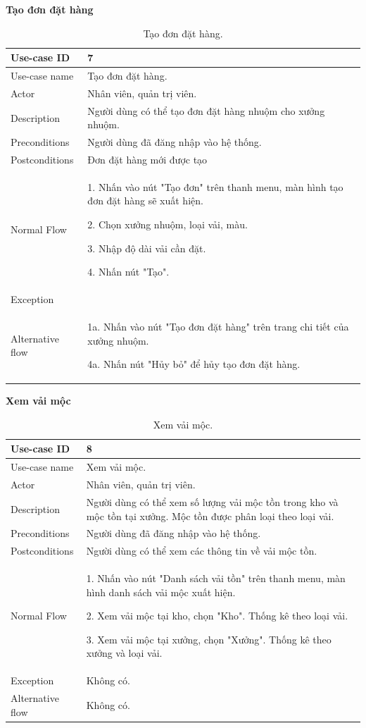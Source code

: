 \newpage
\textbf{Tạo đơn đặt hàng}
\begin{table}[!htp]
    \centering
    \begin{tabular}{|m{3cm}|m{10cm}|}
    \hline 
        Use-case ID & 7\\ \hline
        Use-case name & Tạo đơn đặt hàng.\\ \hline
        Actor & Nhân viên, quản trị viên.\\ \hline
        Description & Người dùng có thể tạo đơn đặt hàng nhuộm cho xưởng nhuộm.\\ \hline
        Preconditions & Người dùng đã đăng nhập vào hệ thống.\\ \hline
        Postconditions & Đơn đặt hàng mới được tạo\\ \hline
        Normal Flow & 
        1. Nhấn vào nút "Tạo đơn" trên thanh menu, màn hình tạo đơn đặt hàng sẽ xuất hiện.\par
        2. Chọn xưởng nhuộm, loại vải, màu.\par
        3. Nhập độ dài vải cần đặt.\par
        4. Nhấn nút "Tạo".
        \\ \hline
        Exception & \\ \hline
        Alternative flow & 
        1a. Nhấn vào nút "Tạo đơn đặt hàng" trên trang chi tiết của xưởng nhuộm.\par
        4a. Nhấn nút "Hủy bỏ" để hủy tạo đơn đặt hàng.
        \\ 
    \hline 
    \end{tabular}
    \caption{Tạo đơn đặt hàng.}
    \label{bang7}
\end{table}

\textbf{Xem vải mộc}
\begin{table}[!htp]
    \centering
    \begin{tabular}{|m{3cm}|m{10cm}|}
    \hline 
        Use-case ID & 8\\ \hline
        Use-case name & Xem vải mộc.\\ \hline
        Actor & Nhân viên, quản trị viên.\\ \hline
        Description & Người dùng có thể xem số lượng vải mộc tồn trong kho và mộc tồn tại xưởng. Mộc tồn được phân loại theo loại vải.\\ \hline
        Preconditions & Người dùng đã đăng nhập vào hệ thống.\\ \hline
        Postconditions & Người dùng có thể xem các thông tin về vải mộc tồn.\\ \hline
        Normal Flow & 
        1. Nhấn vào nút "Danh sách vải tồn" trên thanh menu, màn hình danh sách vải mộc xuất hiện.\par
        2. Xem vải mộc tại kho, chọn "Kho". Thống kê theo loại vải.\par
        3. Xem vải mộc tại xưởng, chọn "Xưởng". Thống kê theo xưởng và loại vải.
        \\ \hline
        Exception & Không có.\\ \hline
        Alternative flow & Không có.\\ 
    \hline 
    \end{tabular}
    \caption{Xem vải mộc.}
    \label{bang8}
\end{table}

